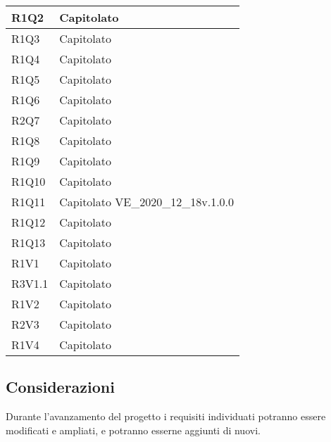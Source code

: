 \begin{center}
\begin{longtable}{|p{22mm}|p{44mm}|}
R1Q2 &
Capitolato \newline
\\
\hline

R1Q3 &
Capitolato \newline
\\
\hline

R1Q4 &
Capitolato \newline
\\
\hline

R1Q5 &
Capitolato \newline
\\
\hline

R1Q6 &
Capitolato \newline
\\
\hline

R2Q7 &
Capitolato \newline
\\
\hline

R1Q8 &
Capitolato \newline
\\
\hline

R1Q9 &
Capitolato \newline
\\
\hline

R1Q10 &
Capitolato \newline
\\
\hline

R1Q11 &
Capitolato \newline
VE\_2020\_12\_18v.1.0.0 \newline
\\
\hline

R1Q12 &
Capitolato \newline
\\
\hline

R1Q13 &
Capitolato \newline
\\
\hline

 R1V1 &
Capitolato \newline
\\
\hline

R3V1.1 &
Capitolato \newline
\\
\hline

R1V2 &
Capitolato \newline
\\
\hline

R2V3 &
Capitolato \newline
\\
\hline

R1V4 &
Capitolato \newline
\\
\hline%
	
	\end{longtable}
\end{center}

\subsection{Considerazioni}
Durante l'avanzamento del progetto i requisiti individuati potranno essere modificati e ampliati, e potranno esserne aggiunti di nuovi.